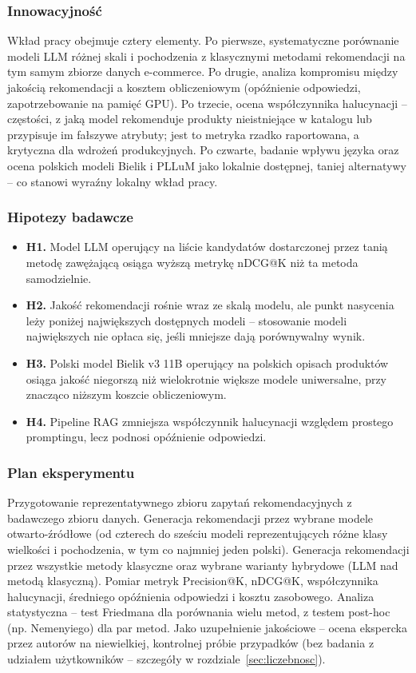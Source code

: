\documentclass[12pt,a4paper]{article}
\newcommand{\topicsection}[1]{\subsubsection*{#1}}
\begin{document}
\topicsection{Innowacyjność}
Wkład pracy obejmuje cztery elementy. Po pierwsze, systematyczne porównanie modeli LLM różnej skali i pochodzenia z klasycznymi metodami rekomendacji na tym samym zbiorze danych e-commerce. Po drugie, analiza kompromisu między jakością rekomendacji a kosztem obliczeniowym (opóźnienie odpowiedzi, zapotrzebowanie na pamięć GPU). Po trzecie, ocena współczynnika halucynacji -- częstości, z jaką model rekomenduje produkty nieistniejące w katalogu lub przypisuje im fałszywe atrybuty; jest to metryka rzadko raportowana, a krytyczna dla wdrożeń produkcyjnych. Po czwarte, badanie wpływu języka oraz ocena polskich modeli Bielik i PLLuM jako lokalnie dostępnej, taniej alternatywy -- co stanowi wyraźny lokalny wkład pracy.

\topicsection{Hipotezy badawcze}
\begin{itemize}
\item \textbf{H1.} Model LLM operujący na liście kandydatów dostarczonej przez tanią metodę zawężającą osiąga wyższą metrykę nDCG@K niż ta metoda samodzielnie.
\item \textbf{H2.} Jakość rekomendacji rośnie wraz ze skalą modelu, ale punkt nasycenia leży poniżej największych dostępnych modeli -- stosowanie modeli największych nie opłaca się, jeśli mniejsze dają porównywalny wynik.
\item \textbf{H3.} Polski model Bielik v3 11B operujący na polskich opisach produktów osiąga jakość niegorszą niż wielokrotnie większe modele uniwersalne, przy znacząco niższym koszcie obliczeniowym.
\item \textbf{H4.} Pipeline RAG zmniejsza współczynnik halucynacji względem prostego promptingu, lecz podnosi opóźnienie odpowiedzi.
\end{itemize}

\topicsection{Plan eksperymentu}
Przygotowanie reprezentatywnego zbioru zapytań rekomendacyjnych z badawczego zbioru danych. Generacja rekomendacji przez wybrane modele otwarto-źródłowe (od czterech do sześciu modeli reprezentujących różne klasy wielkości i pochodzenia, w tym co najmniej jeden polski). Generacja rekomendacji przez wszystkie metody klasyczne oraz wybrane warianty hybrydowe (LLM nad metodą klasyczną). Pomiar metryk Precision@K, nDCG@K, współczynnika halucynacji, średniego opóźnienia odpowiedzi i kosztu zasobowego. Analiza statystyczna -- test Friedmana dla porównania wielu metod, z testem post-hoc (np. Nemenyiego) dla par metod. Jako uzupełnienie jakościowe -- ocena ekspercka przez autorów na niewielkiej, kontrolnej próbie przypadków (bez badania z udziałem użytkowników -- szczegóły w rozdziale~\ref{sec:liczebnosc}).
\end{document}
